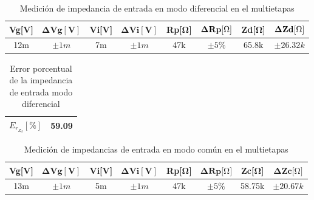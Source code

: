 \begin{enumerate}
        \begin{table}[H]
          \centering
          \begin{tabular}{|c|c|c|c|c|c|c|c|}
            \hline
            \textbf{Vg[V]} & $\mathbf{\Delta Vg[V]}$ & \textbf{Vi[V]} & $\mathbf{\Delta Vi[V]}$ & \textbf{Rp[Ω]} & $\mathbf{\Delta Rp[\ohm]}$ & \textbf{Zd[Ω]} & $\mathbf{\Delta Zd[\ohm]}$ \\ \hline
            12m            & $\pm 1m$                & 7m             & $\pm 1m$                & 47k            & $\pm 5\%$                  & 65.8k          & $\pm 26.32k$               \\ \hline
          \end{tabular}
          \caption{Medición de impedancia de entrada en modo diferencial en el multietapas}
          \label{tab:impedancia_diferencial_multietapas}
        \end{table}

        \begin{table}[H]
          \centering
          \begin{tabular}{|c|c|}
            \hline
            $E_{r_{Z_{d}}} [\%]$ & 59.09 \\
            \hline
          \end{tabular}
          \caption{Error porcentual de la impedancia de entrada modo diferencial}
          \label{tab:error_porcentual3_zid}
        \end{table}


        \begin{table}[H]
          \centering
          \begin{tabular}{|c|c|c|c|c|c|c|c|}
            \hline
            \textbf{Vg[V]} & $\mathbf{\Delta Vg[V]}$ & \textbf{Vi[V]} & $\mathbf{\Delta Vi[V]}$ & \textbf{Rp[}\si{\ohm}\textbf{]} & $\mathbf{\Delta Rp[}\si{\ohm}\textbf{]}$ & \textbf{Zc[}\si{\ohm}\textbf{]} & $\mathbf{\Delta Zc[}\si{\ohm}\textbf{]}$ \\ \hline
            13m            & $\pm 1m$                & 5m             & $\pm 1m$                & 47k                             & $\pm 5\%$                                & 58.75k                          & $\pm 20.67k$                             \\ \hline
          \end{tabular}
          \caption{Medición de impedancias de entrada en modo común en el multietapas}
          \label{tab:impedancias_comun_multietapas}
        \end{table}


\end{enumerate}
